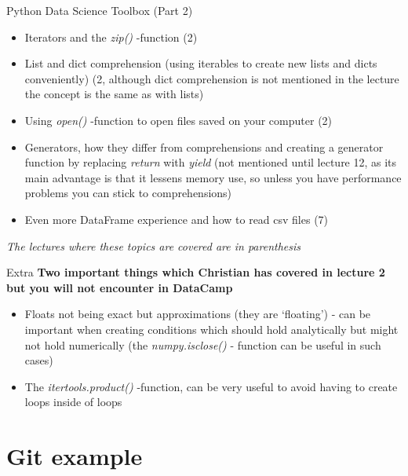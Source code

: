 \documentclass[10pt,danish,t,10pt]{beamer}
\newcommand{\code}[1]{\textit{#1}} %
\begin{document}
\begin{frame}{Python Data Science Toolbox (Part 2)}
    \begin{itemize}
        \item Iterators and the \code{zip()} -function (2)
        \item List and dict comprehension (using iterables to create new lists and dicts conveniently) (2, although dict comprehension is not mentioned in the lecture the concept is the same as with lists)
        \item Using \code{open()} -function to open files saved on your computer (2)
        \item Generators, how they differ from comprehensions and creating a generator function by replacing \code{return} with \code{yield} (not mentioned until lecture 12, as its main advantage is that it lessens memory use, so unless you have performance problems you can stick to comprehensions)
        \item Even more DataFrame experience and how to read csv files (7)
    \end{itemize}
    \mbox{}
    \vfill
    \textit{The lectures where these topics are covered are in parenthesis} 
\end{frame}

\begin{frame}{Extra}
    \textbf{Two important things which Christian has covered in lecture 2 but you will not encounter in DataCamp}
    \begin{itemize}
        \item Floats not being exact but approximations (they are `floating') - can be important when creating conditions which should hold analytically but might not hold numerically (the \code{numpy.isclose()} - function can be useful in such cases)
        \item The \code{itertools.product()} -function, can be very useful to avoid having to create loops inside of loops
    \end{itemize}
\end{frame}


\section{Git example}
\end{document}

